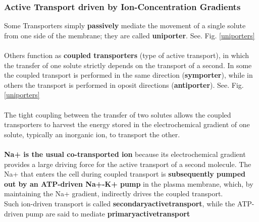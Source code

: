 \documentclass[../main.tex]{subfiles}
\begin{document}
\begin{figure}[H]
	\centering
	\caption{}
\end{figure}

\subsubsection{Active Transport driven by Ion-Concentration Gradients}
Some Transporters simply \textbf{passively} mediate the movement of a single solute from one side of the membrane; they are called \textbf{\gls{uniporter}}. See. Fig. \ref{uniporters}\\
\\
Others function as \textbf{coupled transporters} (type of active transport), in which the transfer of one solute strictly depends on the transport of a second. In some the coupled transport is performed in the same direction (\textbf{\gls{symporter}}), while in others the transport is performed in oposit directions (\textbf{\gls{antiporter}}). See. Fig. \ref{uniporters}\\
\\
The tight coupling between the transfer of two solutes allows the coupled transporters to harvest the energy stored in the electrochemical gradient of one solute, typically an inorganic ion, to transport the other. \\
\\
\textbf{Na+ is the usual co-transported ion} because its electrochemical gradient provides a large driving force for the active transport of a second molecule. The Na+ that enters the cell during coupled transport is \textbf{subsequently pumped out by an ATP-driven Na+-K+ pump} in the plasma membrane, which, by maintaining the Na+ gradient, indirectly drives the coupled transport. \\
Such ion-driven transport is called \textbf{\gls{secondaryactivetransport}}, while the ATP-driven pump are said to mediate \textbf{\gls{primaryactivetransport}} 	
\end{document}
